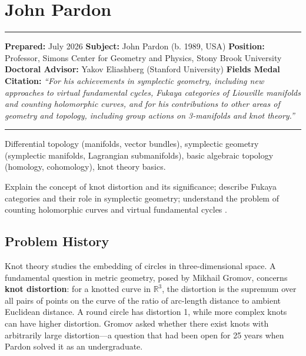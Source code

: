 \chapter{John Pardon}\label{ch2026johnpardon:john-pardon-fields-medal-2026}

\begin{center}\rule{0.5\linewidth}{0.5pt}\end{center}

\textbf{Prepared:} July 2026 \textbf{Subject:} John Pardon (b. 1989, USA) \textbf{Position:} Professor, Simons Center for Geometry and Physics, Stony Brook University \textbf{Doctoral Advisor:} Yakov Eliashberg (Stanford University) \textbf{Fields Medal Citation:} \emph{``For his achievements in symplectic geometry, including new approaches to virtual fundamental cycles, Fukaya categories of Liouville manifolds and counting holomorphic curves, and for his contributions to other areas of geometry and topology, including group actions on 3-manifolds and knot theory.''}

\begin{center}\rule{0.5\linewidth}{0.5pt}\end{center}

\begin{prereqs} Differential topology (manifolds, vector bundles), symplectic geometry (symplectic manifolds, Lagrangian submanifolds), basic algebraic topology (homology, cohomology), knot theory basics. \end{prereqs}

\begin{objectives} Explain the concept of knot distortion and its significance; describe Fukaya categories and their role in symplectic geometry; understand the problem of counting holomorphic curves and virtual fundamental cycles \cite{pardon2016}. \end{objectives}

\section{Problem History}

Knot theory studies the embedding of circles in three-dimensional space. A fundamental question in metric geometry, posed by Mikhail Gromov, concerns \textbf{knot distortion}: for a knotted curve in $\mathbb{R}^3$, the distortion is the supremum over all pairs of points on the curve of the ratio of arc-length distance to ambient Euclidean distance. A round circle has distortion 1, while more complex knots can have higher distortion. Gromov asked whether there exist knots with arbitrarily large distortion---a question that had been open for 25 years when Pardon solved it as an undergraduate.

